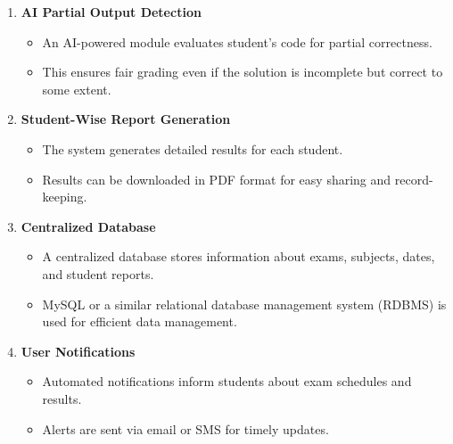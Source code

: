 \documentclass[14pt]{article}
\begin{document}
\begin{enumerate}
\begin{enumerate}
\begin{itemize}
\end{itemize}
\item \textbf{AI Partial Output Detection}
\begin{itemize}
\item An AI-powered module evaluates student's code for partial correctness.
\item This ensures fair grading even if the solution is incomplete but correct to some extent.
\end{itemize}
\item \textbf{Student-Wise Report Generation}
\begin{itemize}
\item The system generates detailed results for each student.
\item Results can be downloaded in PDF format for easy sharing and record-keeping.
\end{itemize}
\item \textbf{Centralized Database}
\begin{itemize}
\item A centralized database stores information about exams, subjects, dates, and student reports.
\item MySQL or a similar relational database management system (RDBMS) is used for efficient data management.
\end{itemize}
\item \textbf{User Notifications}
\begin{itemize}
\item Automated notifications inform students about exam schedules and results.
\item Alerts are sent via email or SMS for timely updates.
\end{itemize}
\end{enumerate}



\end{enumerate}
\end{document}
